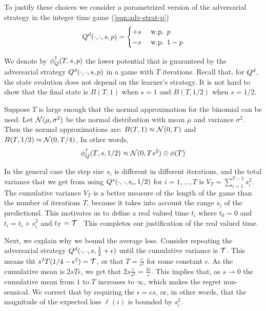 \documentclass{article}[12pt]
\begin{document}
To justify these choices we consider a parametrized version of
the adversarial strategy in the integer time game (\ref{eqn:adv-strat-p})
\begin{equation} \label{eqn:adv-strat-s}
  Q^d(\cdot,\cdot,s,p) =
  \begin{cases}
    +s & \mbox{ w.p. } p\\
    -s & \mbox{ w.p. } 1-p\\
  \end{cases}
\end{equation}

We denote by $\phi_{Q}^{\uparrow}(T,s,p)$ the lower potential that is guaranteed
by the adversarial strategy $Q^d(\cdot,\cdot,s,p)$ in a game with
$T$ iterations. Recall that, for $Q^d$, the state evolution
does not depend on the learner's strategy. It is not hard to
show that the final state is $B(T,1)$ when $s=1$ and $B(T,1/2)$ when $s=1/2$.

Suppose $T$ is large enough that the normal approximation for the
binomial can be used. Let ${\cal N}(\mu,\sigma^2)$ be the normal
distribution with mean $\mu$ and variance $\sigma^2$. Then the normal
approximations are:
$B(T,1) \approx {\cal N}(0,T)$ and $B(T,1/2) \approx {\cal N}(0,T/4)$,
In other words,
$$\phi_{Q}^{\uparrow}(T,s,1/2) \approx {\cal N}(0,Ts^2) \odot \phi(T)$$

In the general case the step size $s_i$ is  different in different
iterations, and the total variance that we get from using
$Q^s(\cdot,\cdot,s_i,1/2)$ for $i=1,\ldots,T$ is
$V_T=\sum_{i=1}^{T-1}s_i^2$. The cumulative variance $V_T$ is a better measure of the
length of the game than the number of iterations $T$, because it takes
into account the range $s_i$ of the predictionsl. This motivates
us to define a real valued time $t_i$ where $t_0=0$ and $t_i =
t_{i}+s_i^2$ and $t_T = {\cal T}$ \
This completes our justification of the real valued time.

Next, we explain why we bound the average loss. Consider repeating the
adversarial strategy \linebreak
$Q^d(\cdot,\cdot,s,\frac{1}{2}+\epsilon)$ until the cumulative
variance is $\mathcal{T}$.  This means tht $s^2 T(1/4-\epsilon^2)=\mathcal{T}$,
or that $T = \frac{c}{\epsilon^2}$ for some constant $c$. As the
cumulative mean is $2sT \epsilon$, we get that
$2s \frac{c}{s^2} = \frac{2c}{s}$. This implies that, as $s \to 0$ the
cumulative mean from $1$ to $T$ increases to $\infty$, which makes the
regret non-sensical. We correct that by requiring the
$\epsilon = c s$, or, in other words, that the magnitude of the
expected loss $\ell(i)$ is bounded by $s_i^2$.
\end{document}
